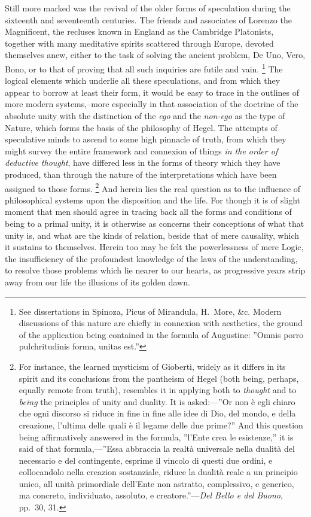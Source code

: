\documentclass[oneside]{book}
\begin{document}
 Still more marked was the revival
of the older forms of speculation during the sixteenth and seventeenth
centuries. The friends and associates of Lorenzo the
Magnificent, the recluses known in England as the Cambridge
Platonists, together with many meditative spirits scattered
through Europe, devoted themselves anew, either to the task of
solving the ancient problem, De Uno, Vero, Bono, or to that of
proving that all such inquiries are futile and vain.%
\footnote{See dissertations in Spinoza, Picus of Mirandula, H.~More, \&c. Modern
discussions of this nature are chiefly in connexion with aesthetics, the ground of
the application being contained in the formula of Augustine: ''Omnis porro
pulchritudinis forma, unitas est.''}%
 The logical
elements which underlie all these speculations, and from which
they appear to borrow at least their form, it would be easy to
trace in the outlines of more modern systems,--more especially
in that association of the doctrine of the absolute unity with the
distinction of the \emph{ego} and the \emph{non-ego} as the type of Nature,
which forms the basis of the philosophy of Hegel. The attempts
of speculative minds to ascend to some high pinnacle of truth,
from which they might survey the entire framework and
connexion of things \emph{in the order of deductive thought}, have differed
less in the forms of theory which they have produced, than
through the nature of the interpretations which have been assigned
to those forms.%
\footnote{For instance, the learned mysticism of Gioberti, widely as it differs in its
spirit and its conclusions from the pantheism of Hegel (both being, perhaps,
equally remote from truth), resembles it in applying both to \emph{thought} and
to \emph{being} the principles of unity and duality. It is asked:---''Or non \`{e} egli
chiaro che ogni discorso si riduce in fine in fine alle idee di Dio, del mondo, e
della creazione, l'ultima delle quali \`{e} il legame delle due prime?''
And this question
being affirmatively answered in the formula, ''l'Ente crea le esistenze,'' it
is said of that formula,---''Essa abbraccia la realt\`{a} universale nella dualit\`{a} del
necessario e del contingente, esprime il vincolo di questi due ordini, e collocandolo
nella creazion sostanziale, riduce la dualit\`{a} reale a un principio unico, all
unit\`{a} primordiale dell'Ente non astratto, complessivo, e generico, ma concreto,
individuato, assoluto, e creatore.''---\textit{Del Bello e del Buono}, pp.~30, 31.}%
 And herein lies the real question as to
the influence of philosophical systems upon the disposition and
the life. For though it is of slight moment that men should
agree in tracing back all the forms and conditions of being to a
primal unity, it is otherwise as concerns their conceptions of
what that unity is, and what are the kinds of relation, beside
that of mere causality, which it sustains to themselves. Herein
too may be felt the powerlessness of mere Logic, the insufficiency
of the profoundest knowledge of the laws of the understanding,
to resolve those problems which lie nearer to our hearts, as progressive
years strip away from our life the illusions of its golden
dawn.
\end{document}

